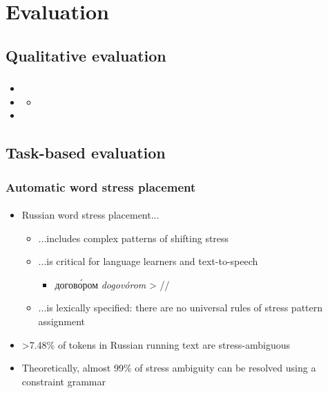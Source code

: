 \documentclass{beamer}
\newcommand{\rus}[1]{\foreignlanguage{russian}{#1}}
\begin{document}
\section{Evaluation}
\subsection{Qualitative evaluation} %
\begin{frame}
\frametitle{}
\framesubtitle{}
\begin{itemize}
	\item 
	\pause
	\item 
	\begin{itemize}
		\item 
		\pause
	\end{itemize}
	\item 
\end{itemize}
\end{frame}

\subsection{Task-based evaluation} %

\begin{frame}
\frametitle{Automatic word stress placement}
\framesubtitle{}
\begin{itemize}
	\item Russian word stress placement...
	\begin{itemize}
		\item ...includes complex patterns of shifting stress
		\pause
		\item ...is critical for language learners and text-to-speech\\
		\begin{itemize}
			\item \rus{догов\'{о}ром} \emph{dogovórom} > //
		\end{itemize}
		\pause
		\item ...is lexically specified: there are no universal rules of stress pattern assignment
		\pause
	\end{itemize}
	\item >7.48\% of tokens in Russian running text are stress-ambiguous
	\item Theoretically, almost 99\% of stress ambiguity can be resolved using a constraint grammar
\end{itemize}
\end{frame}
\end{document}
